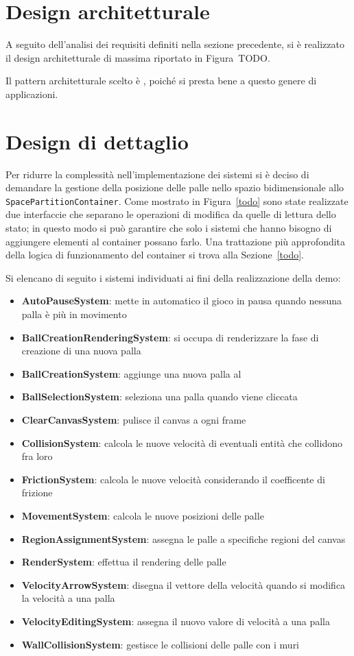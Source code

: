 \section{Design architetturale}\label{sec:demo-design-architetturale}
A seguito dell'analisi dei requisiti definiti nella sezione precedente, si è realizzato il design architetturale di
massima riportato in Figura~TODO\@.

Il pattern architetturale scelto è \ECS, poiché si presta bene a questo genere di applicazioni.

\section{Design di dettaglio}\label{sec:demo-design-di-dettaglio}
Per ridurre la complessità nell'implementazione dei sistemi si è deciso di demandare la gestione della posizione delle
palle nello spazio bidimensionale allo \texttt{SpacePartitionContainer}.
Come mostrato in Figura~\ref{todo} sono state realizzate due interfaccie che separano le operazioni di modifica da
quelle di lettura dello stato;
in questo modo si può garantire che solo i sistemi che hanno bisogno di aggiungere elementi al container possano farlo.
Una trattazione più approfondita della logica di funzionamento del container si trova alla Sezione~\ref{todo}.

Si elencano di seguito i sistemi individuati ai fini della realizzazione della demo:
\begin{itemize}
    \item \textbf{AutoPauseSystem}: mette in automatico il gioco in pausa quando nessuna palla è più in movimento
    \item \textbf{BallCreationRenderingSystem}: si occupa di renderizzare la fase di creazione di una nuova palla
    \item \textbf{BallCreationSystem}: aggiunge una nuova palla al \World
    \item \textbf{BallSelectionSystem}: seleziona una palla quando viene cliccata
    \item \textbf{ClearCanvasSystem}: pulisce il canvas a ogni frame
    \item \textbf{CollisionSystem}: calcola le nuove velocità di eventuali entità che collidono fra loro
    \item \textbf{FrictionSystem}: calcola le nuove velocità considerando il coefficente di frizione
    \item \textbf{MovementSystem}: calcola le nuove posizioni delle palle
    \item \textbf{RegionAssignmentSystem}: assegna le palle a specifiche regioni del canvas
    \item \textbf{RenderSystem}: effettua il rendering delle palle
    \item \textbf{VelocityArrowSystem}: disegna il vettore della velocità quando si modifica la velocità a una palla
    \item \textbf{VelocityEditingSystem}: assegna il nuovo valore di velocità a una palla
    \item \textbf{WallCollisionSystem}: gestisce le collisioni delle palle con i muri
\end{itemize}

